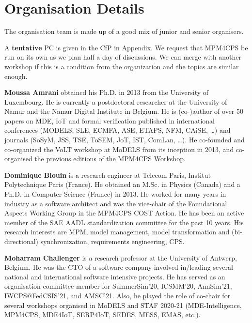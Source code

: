 \section{Organisation Details}
\label{sec:Organisation}



The organisation team is made up of a good mix of junior and senior organisers.

A \textbf{tentative} PC is given in the CfP in Appendix.
We request that MPM4CPS be run on its own as we plan half a day of discussions.
We can merge with another workshop if this is a condition from the organization 
and the topics are similar enough.

\medskip
\noindent
\textbf{Moussa Amrani} obtained his Ph.D. in 2013 from the University of Luxembourg. 
He is currently a postdoctoral researcher at the University of Namur and the Namur Digital Institute in Belgium. 
He is (co-)author of over 50 papers on MDE, IoT and formal verification published in international conferences (MODELS, SLE, ECMFA, ASE, ETAPS, NFM, CAiSE, \ldots) and journals (SoSyM, JSS, TSE, ToSEM, JoT, IST, ComLan, \ldots). He co-founded and co-organized the VoLT workshop at MoDELS from its inception in 2013, and co-organised
the previous editions of the MPM4CPS Workshop.

\medskip
\noindent
\textbf{Dominique Blouin} is a research engineer at Telecom Paris, Institut Polytechnique Paris 
(France). He obtained an M.Sc. in Physics (Canada) and a Ph.D. in Computer Science (France) in 2013. He worked for many years in industry as a software architect and was the vice-chair of the Foundational Aspects Working Group in the MPM4CPS COST Action. He has been an active member of the SAE AADL standardization committee for the past 10 years. His research interests are MPM, model management, model transformation and (bi-directional) synchronization, requirements engineering, CPS.

\medskip
\noindent
\textbf{Moharram Challenger} is a research professor at the University of Antwerp, Belgium. He was the CTO of a software company involved-in/leading several national and international software intensive projects. He has served as an organisation committee member for SummerSim'20, ICSMM'20, AnnSim'21, IWCPS@FedCSIS'21, and AMSC'21. Also, he played the role of co-chair for several workshops organised in MoDELS and STAF 2020-21 (MDE-Intelligence, MPM4CPS, MDE4IoT, SERP4IoT, SEDES, MESS, EMAS, etc.).

